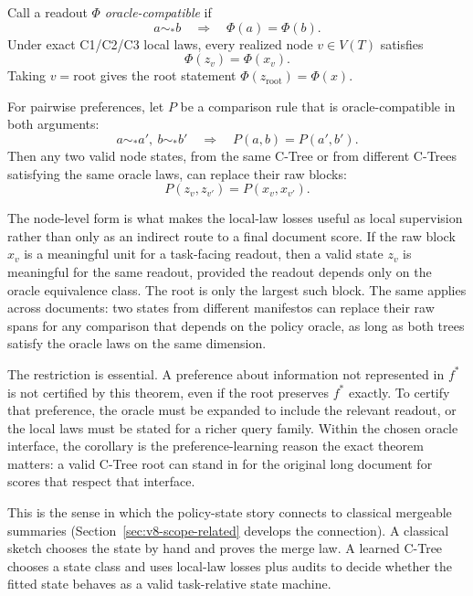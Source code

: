\begin{corollary}
\label{cor:v8-preferences-pass-to-root}
Call a readout \(\Phi\) \emph{oracle-compatible} if
\[
  a\sim_\ast b \quad\Longrightarrow\quad \Phi(a)=\Phi(b).
\]
Under exact C1/C2/C3 local laws, every realized node \(v\in V(T)\) satisfies
\[
  \Phi(z_v)=\Phi(x_v).
\]
Taking \(v=\mathrm{root}\) gives the root statement
\(\Phi(z_{\mathrm{root}})=\Phi(x)\).

For pairwise preferences, let \(P\) be a comparison rule that is
oracle-compatible in both arguments:
\[
  a\sim_\ast a',\ b\sim_\ast b'
  \quad\Longrightarrow\quad
  P(a,b)=P(a',b').
\]
Then any two valid node states, from the same C-Tree or from different
C-Trees satisfying the same oracle laws, can replace their raw blocks:
\[
  P(z_v,z_{v'})=P(x_v,x_{v'}).
\]
\end{corollary}

The node-level form is what makes the local-law losses useful as local
supervision rather than only as an indirect route to a final document score. If
the raw block \(x_v\) is a meaningful unit for a task-facing readout, then a
valid state \(z_v\) is meaningful for the same readout, provided the readout
depends only on the oracle equivalence class. The root is only the largest
such block. The same applies across documents: two states from
different manifestos can replace their raw spans for any comparison
that depends on the policy oracle, as long as both trees satisfy the
oracle laws on the same dimension.

The restriction is essential. A preference about information not represented in
\(f^\ast\) is not certified by this theorem, even if the root preserves
\(f^\ast\) exactly. To certify that preference, the oracle must be expanded to
include the relevant readout, or the local laws must be stated for a richer
query family. Within the chosen oracle interface, the corollary is the
preference-learning reason the exact theorem matters: a valid C-Tree root can
stand in for the original long document for scores that respect that interface.

This is the sense in which the policy-state story connects to
classical mergeable summaries (Section~\ref{sec:v8-scope-related}
develops the connection). A classical sketch chooses the state by
hand and proves the merge law. A learned C-Tree chooses a state class
and uses local-law losses plus audits to decide whether the fitted
state behaves as a valid task-relative state machine.

